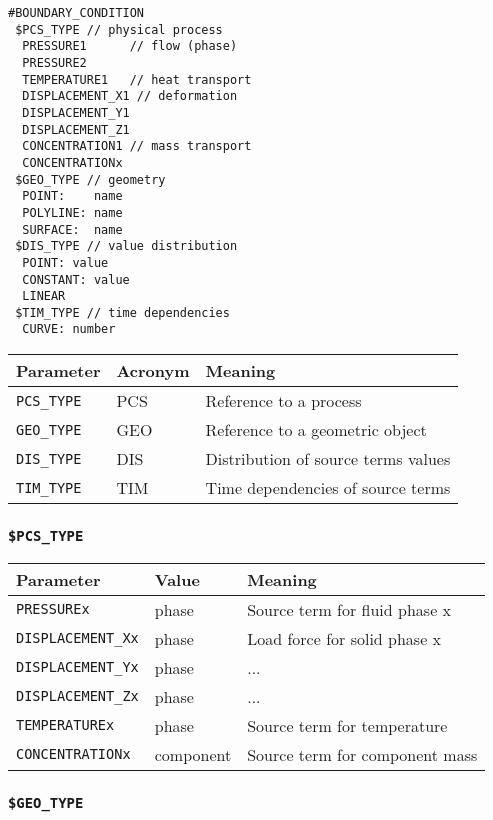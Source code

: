 \begin{verbatim}
#BOUNDARY_CONDITION
 $PCS_TYPE // physical process
  PRESSURE1      // flow (phase)
  PRESSURE2
  TEMPERATURE1   // heat transport
  DISPLACEMENT_X1 // deformation
  DISPLACEMENT_Y1
  DISPLACEMENT_Z1
  CONCENTRATION1 // mass transport
  CONCENTRATIONx
 $GEO_TYPE // geometry
  POINT:    name
  POLYLINE: name
  SURFACE:  name
 $DIS_TYPE // value distribution
  POINT: value
  CONSTANT: value
  LINEAR
 $TIM_TYPE // time dependencies
  CURVE: number
\end{verbatim}


\begin{tabular*}{12.773cm}{|p{}|p{1.5cm}|p{7cm}|} \hline
Parameter          & Acronym & Meaning \\ \hline \hline
%
\texttt{PCS\_TYPE} & PCS &  Reference to a process \\
\texttt{GEO\_TYPE} & GEO &  Reference to a geometric object \\
\texttt{DIS\_TYPE} & DIS &  Distribution of source terms values \\
\texttt{TIM\_TYPE} & TIM &  Time dependencies of source terms \\
\hline
\end{tabular*}

\subsubsection{\texttt{\$PCS\_TYPE}}

\begin{tabular*}{12.773cm}{|p{}|p{1.5cm}|p{7cm}|} \hline
Parameter          & Value & Meaning \\ \hline \hline
%
\texttt{PRESSUREx}        & phase & Source term for fluid phase x \\
\texttt{DISPLACEMENT\_Xx} & phase & Load force for solid phase x \\
\texttt{DISPLACEMENT\_Yx} & phase & ... \\
\texttt{DISPLACEMENT\_Zx} & phase & ... \\
\texttt{TEMPERATUREx}     & phase & Source term for temperature \\
\texttt{CONCENTRATIONx}   & component & Source term for component mass \\
\hline
\end{tabular*}

\subsubsection{\texttt{\$GEO\_TYPE}}

